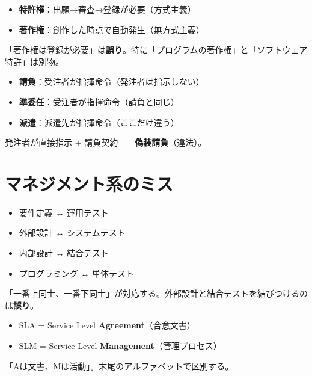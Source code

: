 \begin{yokumiss}[特許権と著作権の取得方法の混同]
\begin{itemize}
  \item \textbf{特許権}：出願→審査→登録が必要（方式主義）
  \item \textbf{著作権}：創作した時点で自動発生（無方式主義）
\end{itemize}
「著作権は登録が必要」は\textbf{誤り}。特に「プログラムの著作権」と「ソフトウェア特許」は別物。
\end{yokumiss}

\begin{yokumiss}[請負と派遣の指揮命令権]
\begin{itemize}
  \item \textbf{請負}：受注者が指揮命令（発注者は指示しない）
  \item \textbf{準委任}：受注者が指揮命令（請負と同じ）
  \item \textbf{派遣}：派遣先が指揮命令（ここだけ違う）
\end{itemize}
発注者が直接指示 $+$ 請負契約 $=$ \textbf{偽装請負}（違法）。
\end{yokumiss}

\section*{マネジメント系のミス}

\begin{yokumiss}[V字モデルの対応関係の逆転]
\begin{itemize}
  \item 要件定義 ↔ 運用テスト
  \item 外部設計 ↔ システムテスト
  \item 内部設計 ↔ 結合テスト
  \item プログラミング ↔ 単体テスト
\end{itemize}
「一番上同士、一番下同士」が対応する。外部設計と結合テストを結びつけるのは\textbf{誤り}。
\end{yokumiss}

\begin{yokumiss}[SLAとSLMの逆転]
\begin{itemize}
  \item SLA = Service Level \textbf{Agreement}（合意文書）
  \item SLM = Service Level \textbf{Management}（管理プロセス）
\end{itemize}
「Aは文書、Mは活動」。末尾のアルファベットで区別する。
\end{yokumiss}

